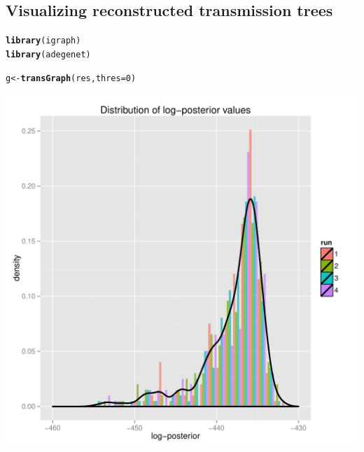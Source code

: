 \documentclass{article}\usepackage[]{graphicx}\usepackage[]{color}
\makeatletter
\newcommand{\hlnum}[1]{\textcolor[rgb]{0.686,0.059,0.569}{#1}}%
\newcommand{\hlstd}[1]{\textcolor[rgb]{0.345,0.345,0.345}{#1}}%
\newcommand{\hlkwb}[1]{\textcolor[rgb]{0.69,0.353,0.396}{#1}}%
\newcommand{\hlkwc}[1]{\textcolor[rgb]{0.333,0.667,0.333}{#1}}%
\newcommand{\hlkwd}[1]{\textcolor[rgb]{0.737,0.353,0.396}{\textbf{#1}}}%
\newenvironment{kframe}{%
 \def\at@end@of@kframe{}%
 \ifinner\ifhmode%
  \def\at@end@of@kframe{\end{minipage}}%
  \begin{minipage}{\columnwidth}%
 \fi\fi%
 \def\FrameCommand##1{\hskip\@totalleftmargin \hskip-\fboxsep
 \colorbox{shadecolor}{##1}\hskip-\fboxsep
     \hskip-\linewidth \hskip-\@totalleftmargin \hskip\columnwidth}%
 \MakeFramed {\advance\hsize-\width
   \@totalleftmargin\z@ \linewidth\hsize
   \@setminipage}}%
 {\par\unskip\endMakeFramed%
 \at@end@of@kframe}
\newenvironment{knitrout}{}{} %
\makeatother
\begin{document}
\subsection{Visualizing reconstructed transmission trees}

\begin{knitrout}
\color{fgcolor}\begin{kframe}
\begin{alltt}
\hlkwd{library}\hlstd{(igraph)}
\hlkwd{library}\hlstd{(adegenet)}
\end{alltt}
\end{kframe}
\end{knitrout}

\begin{knitrout}
\color{fgcolor}\begin{kframe}
\begin{alltt}
\hlstd{g} \hlkwb{<-} \hlkwd{transGraph}\hlstd{(res,} \hlkwc{thres}\hlstd{=}\hlnum{0}\hlstd{)}
\end{alltt}
\end{kframe}

{\centering \includegraphics[width=.6\textwidth]{figs/unnamed-chunk-18} 

}



\end{knitrout}
\end{document}

